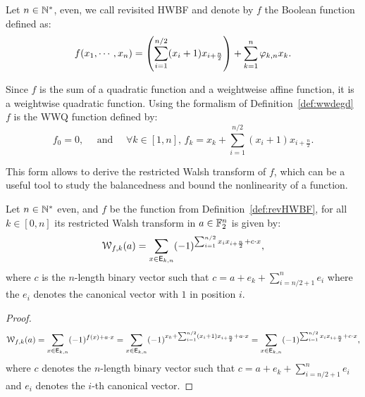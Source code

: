 \documentclass[11pt]{llncs}
\begin{document}
\begin{definition}\label{def:revHWBF}
Let $n\in \mathbb{N}^*$, even, we call revisited HWBF and denote by $f$ the Boolean function defined as:
\[f(x_1,\cdots,x_n)=\left(\sum_{i=1}^{n/2} (x_i+1) x_{i+\frac{n}{2}}\right) + \sum_{k=1}^n \varphi_{k,n} x_k.\]
\end{definition}



Since $f$ is the sum of a quadratic function and a weightweise affine function, it is a weightwise quadratic function. 
Using the formalism of Definition~\ref{def:wwdegd} $f$ is the WWQ function defined by:%
\[f_0=0, \quad \text{ and } \quad \forall k \in [1,n], \, f_k=x_k+\sum_{i=1}^{n/2} (x_i+1) x_{i+\frac{n}{2}}.\]

This form allows to derive the restricted Walsh transform of $f$, which can be a useful tool to study the balancedness and bound the nonlinearity of a function.



\begin{proposition}\label{prop:restrWT}
Let $n \in \mathbb{N}^*$ even, and $f$ be the function from Definition~\ref{def:revHWBF}, for all $k\in [0,n]$ its restricted Walsh transform in $a\in \mathbb{F}_2^n$ is given by:
\[\mathcal{W}_{f,k}(a)=\sum_{x \in \mathsf{E}_{k,n}} (-1)^{\sum_{i=1}^{n/2} x_i x_{i+\frac{n}{2}}+ c \cdot x},\]
where $c$ is the $n$-length binary vector such that $c=a+e_k+\sum_{i=n/2+1}^n e_i$ where the $e_i$ denotes the canonical vector with $1$ in position $i$.
\end{proposition}
\begin{proof}
\[	\mathcal{W}_{f,k}(a)=\sum_{x \in \mathsf{E}_{k,n}} (-1)^{f(x)+a \cdot x}
	=\sum_{x \in \mathsf{E}_{k,n}} (-1)^{x_k + \sum_{i=1}^{n/2} (x_i+1) x_{i+\frac{n}{2}}+ a \cdot x}\\
	=\sum_{x \in \mathsf{E}_{k,n}} (-1)^{\sum_{i=1}^{n/2} x_i x_{i+\frac{n}{2}}+ c \cdot x},\]
where $c$ denotes the $n$-length binary vector such that $c=a+e_k+\sum_{i=n/2+1}^n e_i$ and $e_i$ denotes the $i$-th canonical vector.
\end{proof}
\end{document}
